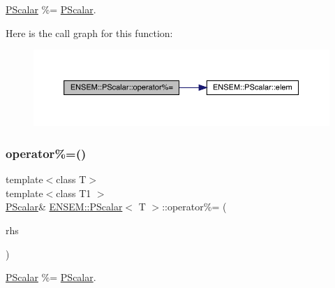 \mbox{\hyperlink{classENSEM_1_1PScalar}{P\+Scalar}} \%= \mbox{\hyperlink{classENSEM_1_1PScalar}{P\+Scalar}}. 

Here is the call graph for this function\+:
\nopagebreak
\begin{figure}[H]
\begin{center}
\leavevmode
\includegraphics[width=350pt]{d3/d27/classENSEM_1_1PScalar_ab583ff2667eba7d2bed2acbd3c15e43e_cgraph}
\end{center}
\end{figure}
\mbox{\label{classENSEM_1_1PScalar_ab583ff2667eba7d2bed2acbd3c15e43e}} 
\subsubsection{\texorpdfstring{operator\%=()}{operator\%=()}\hspace{0.1cm}{\footnotesize\ttfamily [2/2]}}
{\footnotesize\ttfamily template$<$class T$>$ \\
template$<$class T1 $>$ \\
\mbox{\hyperlink{classENSEM_1_1PScalar}{P\+Scalar}}\& \mbox{\hyperlink{classENSEM_1_1PScalar}{E\+N\+S\+E\+M\+::\+P\+Scalar}}$<$ T $>$\+::operator\%= (\begin{DoxyParamCaption}\item[{const \mbox{\hyperlink{classENSEM_1_1PScalar}{P\+Scalar}}$<$ T1 $>$ \&}]{rhs }\end{DoxyParamCaption})\hspace{0.3cm}{\ttfamily [inline]}}



\mbox{\hyperlink{classENSEM_1_1PScalar}{P\+Scalar}} \%= \mbox{\hyperlink{classENSEM_1_1PScalar}{P\+Scalar}}. 

